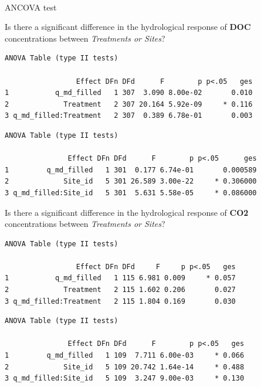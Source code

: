 \documentclass[
]{article}
\makeatletter
\let\oldparagraph\paragraph
\renewcommand{\paragraph}{
    \@ifstar
      \xxxParagraphStar
      \xxxParagraphNoStar
  }
\newcommand{\xxxParagraphStar}[1]{\oldparagraph*{#1}\mbox{}}
\newcommand{\xxxParagraphNoStar}[1]{\oldparagraph{#1}\mbox{}}
\makeatother
\begin{document}
\paragraph{ANCOVA test}\label{ancova-test}

Is there a significant difference in the hydrological response of
\textbf{DOC} concentrations between \emph{Treatments or Sites}?

\begin{verbatim}
ANOVA Table (type II tests)

                 Effect DFn DFd      F        p p<.05   ges
1           q_md_filled   1 307  3.090 8.00e-02       0.010
2             Treatment   2 307 20.164 5.92e-09     * 0.116
3 q_md_filled:Treatment   2 307  0.389 6.78e-01       0.003
\end{verbatim}

\begin{verbatim}
ANOVA Table (type II tests)

               Effect DFn DFd      F        p p<.05      ges
1         q_md_filled   1 301  0.177 6.74e-01       0.000589
2             Site_id   5 301 26.589 3.00e-22     * 0.306000
3 q_md_filled:Site_id   5 301  5.631 5.58e-05     * 0.086000
\end{verbatim}

Is there a significant difference in the hydrological response of
\textbf{CO2} concentrations between \emph{Treatments or Sites}?

\begin{verbatim}
ANOVA Table (type II tests)

                 Effect DFn DFd     F     p p<.05   ges
1           q_md_filled   1 115 6.981 0.009     * 0.057
2             Treatment   2 115 1.602 0.206       0.027
3 q_md_filled:Treatment   2 115 1.804 0.169       0.030
\end{verbatim}

\begin{verbatim}
ANOVA Table (type II tests)

               Effect DFn DFd      F        p p<.05   ges
1         q_md_filled   1 109  7.711 6.00e-03     * 0.066
2             Site_id   5 109 20.742 1.64e-14     * 0.488
3 q_md_filled:Site_id   5 109  3.247 9.00e-03     * 0.130
\end{verbatim}
\end{document}
